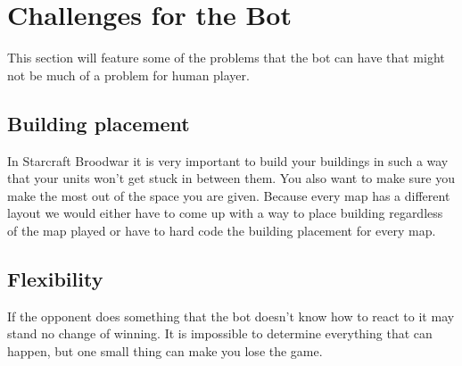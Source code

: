 \section{Challenges for the Bot}
	This section will feature some of the problems that the bot can have that might not be much of a problem for human player.
	\subsection*{Building placement}
		In Starcraft Broodwar it is very important to build your buildings in such a 
		way that your units won't get stuck in between  them. You also want to make sure you make the most out of the space you are given. 
		Because every map has
		a different layout we would either have to come up with a way to place building regardless of the map played or have to hard code the building 
		placement for every map.
	
	\subsection*{Flexibility}
		If the opponent does something that the bot doesn't know how to react to it may stand no change of winning. 
		It is impossible to determine everything that can happen, but one small thing can make you lose the game. 